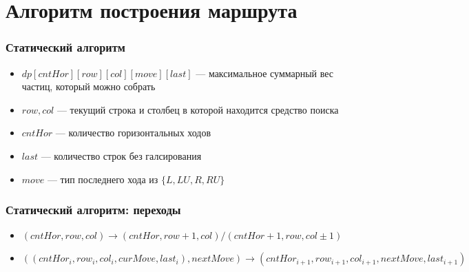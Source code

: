 \documentclass{beamer} %
\theoremstyle{definition} %
\def\putImg<#1>#2{ \includegraphics<#1>[width=\textwidth]{../img/#2} }
\begin{document}
\begin{comment}
\begin{frame}
  \frametitle{Проблема}
\begin{columns}
\column{.6\textwidth}
\putImg<+>{pic07-1.png}
\putImg<+>{pic07-2.png}
\column{.4\textwidth}
\only<.>{изначально выделенной текстуры недостаточно}
\end{columns}
\end{frame}

\begin{frame}
  \frametitle{Решение проблемы}
\begin{columns}
\column{.6\textwidth}
\putImg<+>{pic07-3.png}
\putImg<+>{pic07-4.png}
\putImg<+>{pic07-5.png}
\column{.4\textwidth}
\only<.(-2)->{Начинает выходить?}
\begin{itemize}
  \item<.(-1)->{перецентрировать}
  \item<.(0)->{увеличить x2 (совместить четыре ячейки в одну)}
\end{itemize}
\end{columns}
\end{frame}
\end{comment}

\section{Алгоритм построения маршрута}
\begin{frame}
\frametitle{Статический алгоритм}
\begin{itemize}
\item{$dp[cntHor][row][col][move][last]$ --- максимальное суммарный вес частиц, который можно собрать}
\item{$row, col$ --- текущий строка и столбец в которой находится средство поиска}
\item{$cntHor$ --- количество горизонтальных ходов}
\item{$last$ --- количество строк без галсирования}
\item{$move$ --- тип последнего хода из $\{L, LU, R, RU\}$} 

\end{itemize}
\end{frame}

\begin{frame}
\frametitle{Статический алгоритм: переходы}
\begin{itemize}
\item{$(cntHor, row, col) \to (cntHor, row+1, col)/(cntHor+1,row, col \pm 1)$}
\\
\item{$((cntHor_i, row_i, col_i, curMove, last_i), nextMove) \to 
(cntHor_{i+1}, row_{i+1}, col_{i+1}, nextMove, last_{i+1})$}
\end{itemize}
\end{frame}
\end{document}
